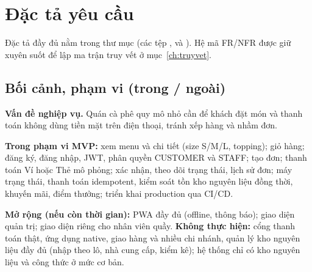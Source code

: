 \documentclass[a4paper]{article}
\begin{document}
\section{Đặc tả yêu cầu}\label{ch:yeucau}
Đặc tả đầy đủ nằm trong thư mục  (các tệp ,  và ). Hệ mã FR/NFR được giữ xuyên suốt để lập ma trận truy vết ở mục~\ref{ch:truyvet}.

\subsection{Bối cảnh, phạm vi (trong / ngoài)}\label{sec:se-phamvi}
\textbf{Vấn đề nghiệp vụ.} Quán cà phê quy mô nhỏ cần để khách đặt món và thanh toán không dùng tiền mặt trên điện thoại, tránh xếp hàng và nhầm đơn.

\textbf{Trong phạm vi MVP:} xem menu và chi tiết (size S/M/L, topping); giỏ hàng; đăng ký, đăng nhập, JWT, phân quyền CUSTOMER và STAFF; tạo đơn; thanh toán Ví hoặc Thẻ mô phỏng; xác nhận, theo dõi trạng thái, lịch sử đơn; máy trạng thái, thanh toán idempotent, kiểm soát tồn kho nguyên liệu đồng thời, khuyến mãi, điểm thưởng; triển khai production qua CI/CD.

\textbf{Mở rộng (nếu còn thời gian):} PWA đầy đủ (offline, thông báo); giao diện quản trị; giao diện riêng cho nhân viên quầy. \textbf{Không thực hiện:} cổng thanh toán thật, ứng dụng native, giao hàng và nhiều chi nhánh, quản lý kho nguyên liệu đầy đủ (nhập theo lô, nhà cung cấp, kiểm kê); hệ thống chỉ có kho nguyên liệu và công thức ở mức cơ bản.
\end{document}
